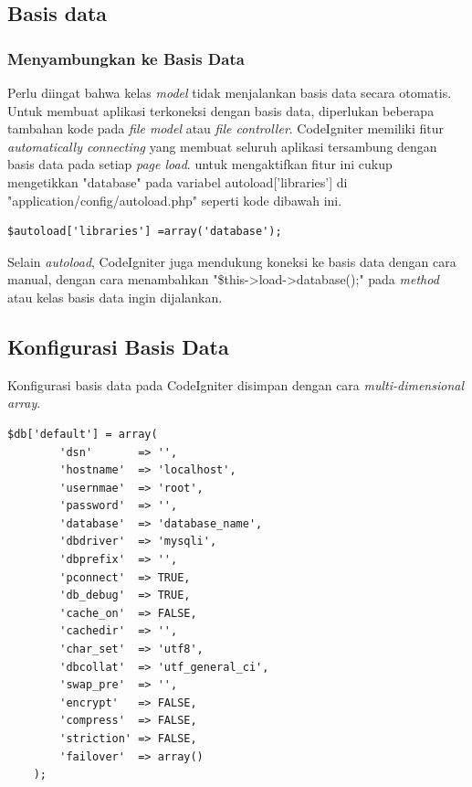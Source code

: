 	\subsection{Basis data}
	\label{sub: database}
	
	\subsubsection{Menyambungkan ke Basis Data}
	\label{subsub: connectDatabase}
	
	Perlu diingat bahwa kelas \textit{model} tidak menjalankan basis data secara otomatis. Untuk membuat aplikasi terkoneksi dengan basis data, diperlukan beberapa tambahan kode pada \textit{file model} atau \textit{file controller}.
	CodeIgniter memiliki fitur \textit{automatically connecting} yang membuat seluruh aplikasi tersambung dengan basis data pada setiap \textit{page load}. untuk mengaktifkan fitur ini cukup mengetikkan "database" pada variabel autoload['libraries'] di "application/config/autoload.php" seperti kode dibawah ini.
	
	\begin{lstlisting}
$autoload['libraries'] =array('database');
	\end{lstlisting}
	
	Selain \textit{autoload}, CodeIgniter juga mendukung koneksi ke basis data dengan cara manual, dengan cara menambahkan "\$this->load->database();" pada \textit{method} atau kelas basis data ingin dijalankan.
	
	\subsection{Konfigurasi Basis Data}
	\label{sub: databaseConf}
	
	Konfigurasi basis data pada CodeIgniter disimpan dengan cara \textit{multi-dimensional array}.
	
	\begin{lstlisting}
$db['default'] = array(
		'dsn'		=> '',
		'hostname'	=> 'localhost',
		'usernmae'	=> 'root',
		'password'	=> '',
		'database'	=> 'database_name',
		'dbdriver'	=> 'mysqli',
		'dbprefix'	=> '',
		'pconnect'	=> TRUE,
		'db_debug'	=> TRUE,
		'cache_on'	=> FALSE,
		'cachedir'	=> '',
		'char_set'	=> 'utf8',
		'dbcollat'	=> 'utf_general_ci',
		'swap_pre'	=> '',
		'encrypt'	=> FALSE,
		'compress'	=> FALSE,
		'striction'	=> FALSE,
		'failover'	=> array()
	);
	\end{lstlisting}
	
